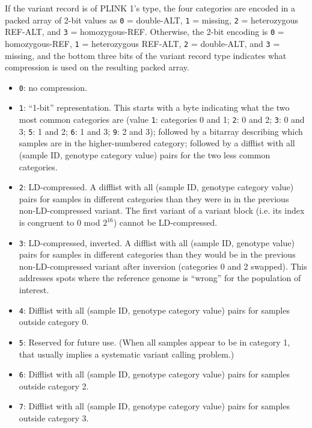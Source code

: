 \documentclass[8pt]{article}
\begin{document}
If the variant record is of PLINK 1's type, the four categories are encoded in
a packed array of 2-bit values as \texttt{0} = double-ALT, \texttt{1} =
missing, \texttt{2} = heterozygous REF-ALT, and \texttt{3} = homozygous-REF.
Otherwise, the 2-bit encoding is \texttt{0} = homozygous-REF, \texttt{1} =
heterozygous REF-ALT, \texttt{2} = double-ALT, and \texttt{3} = missing, and
the bottom three bits of the variant record type indicates what compression is
used on the resulting packed array.

\begin{itemize}
\item \texttt{0}: no compression.
\item \texttt{1}: ``1-bit'' representation.  This starts with a byte indicating
  what the two most common categories are (value \texttt{1}: categories 0 and
  1; \texttt{2}: 0 and 2; \texttt{3}: 0 and 3; \texttt{5}: 1 and 2; \texttt{6}:
  1 and 3; \texttt{9}: 2 and 3); followed by a bitarray describing which
  samples are in the higher-numbered category; followed by a difflist with all
  (sample ID, genotype category value) pairs for the two less common
  categories.
\item \texttt{2}: LD-compressed.  A difflist with all (sample ID, genotype
  category value) pairs for samples in different categories than they were in
  in the previous non-LD-compressed variant.  The first variant of a variant
  block (i.e. its index is congruent to 0 mod $2^{16}$) cannot be
  LD-compressed.
\item \texttt{3}: LD-compressed, inverted.  A difflist with all (sample ID,
  genotype value) pairs for samples in different categories than they would be
  in the previous non-LD-compressed variant after inversion (categories 0 and 2
  swapped).  This addresses spots where the reference genome is ``wrong'' for
  the population of interest.
\item \texttt{4}: Difflist with all (sample ID, genotype category value) pairs
  for samples outside category 0.
\item \texttt{5}: Reserved for future use.  (When all samples appear to be in
  category 1, that usually implies a systematic variant calling problem.)
\item \texttt{6}: Difflist with all (sample ID, genotype category value) pairs
  for samples outside category 2.
\item \texttt{7}: Difflist with all (sample ID, genotype category value) pairs
  for samples outside category 3.
\end{itemize}
\end{document}
